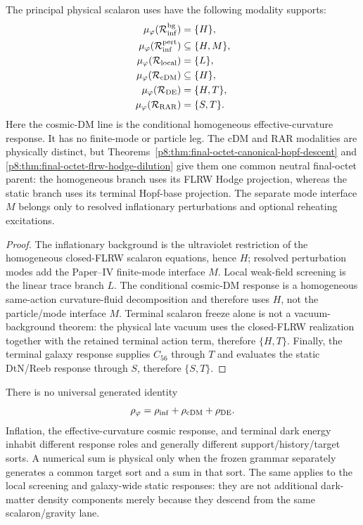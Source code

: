 \documentclass[12pt,a4paper]{article}
\begin{document}
\begin{corollary}
\label{p8:cor:scalaron-five-role-support}
The principal physical scalaron uses have the following modality supports:
\begin{align}
\mu_{\varphi}(\mathcal R_{\rm inf}^{\rm bg})&=\{H\},\\
\mu_{\varphi}(\mathcal R_{\rm inf}^{\rm pert})&\subseteq\{H,M\},\\
\mu_{\varphi}(\mathcal R_{\rm local})&=\{L\},\\
\mu_{\varphi}(\mathcal R_{\rm cDM})&\subseteq\{H\},\\
\mu_{\varphi}(\mathcal R_{\rm DE})&=\{H,T\},\\
\mu_{\varphi}(\mathcal R_{\rm RAR})&=\{S,T\}.
\end{align}
Here the cosmic-DM line is the conditional homogeneous effective-curvature
response.  It has no finite-mode or particle leg.  The cDM and RAR modalities
are physically distinct, but
Theorems~\ref{p8:thm:final-octet-canonical-hopf-descent} and
\ref{p8:thm:final-octet-flrw-hodge-dilution} give them one common neutral
final-octet parent: the homogeneous branch uses its FLRW Hodge projection,
whereas the static branch uses its terminal Hopf-base projection.  The
separate mode interface \(M\) belongs only to resolved inflationary
perturbations and optional reheating excitations.
\end{corollary}

\begin{proof}
The inflationary background is the ultraviolet restriction of the homogeneous
closed-FLRW scalaron equations, hence $H$; resolved perturbation modes add the
Paper--IV finite-mode interface $M$.  Local weak-field screening is the linear
trace branch $L$.  The conditional cosmic-DM response is a homogeneous
same-action curvature-fluid decomposition and therefore uses \(H\), not the
particle/mode interface \(M\).  Terminal scalaron freeze
alone is not a vacuum-background theorem: the physical late vacuum uses the
closed-FLRW realization together with the retained terminal action term,
therefore $\{H,T\}$.  Finally, the terminal galaxy response supplies $C_{56}$
through $T$ and evaluates the static DtN/Reeb response through $S$, therefore
$\{S,T\}$. \qedhere
\end{proof}

\begin{corollary}
\label{p8:cor:no-scalaron-triple-counting}
There is no universal generated identity
\[
    \rho_{\varphi}
    =\rho_{\rm inf}+\rho_{\rm cDM}+\rho_{\rm DE}.
\]
Inflation, the effective-curvature cosmic response, and terminal dark energy
inhabit different response roles and generally different
support/history/target sorts.  A
numerical sum is physical only when the frozen grammar separately generates a
common target sort and a sum in that sort.  The same applies to the local
screening and galaxy-wide static responses: they are not additional dark-matter
density components merely because they descend from the same scalaron/gravity
lane.
\end{corollary}
\end{document}
